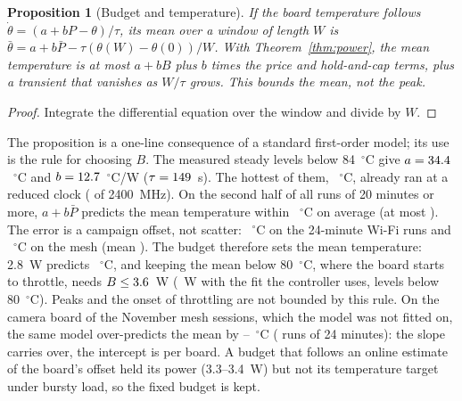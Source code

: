 \documentclass[conference]{IEEEtran}
\newtheorem{proposition}{Proposition}
\begin{document}
\begin{proposition}[Budget and temperature]\label{prop:temp}
If the board temperature follows $\dot\theta = (a + bP - \theta)/\tau$, its mean over a window of length $W$ is
$\bar\theta = a + b\bar P - \tau(\theta(W) - \theta(0))/W$. With Theorem~\ref{thm:power}, the mean temperature is at
most $a + bB$ plus $b$ times the price and hold-and-cap terms, plus a transient that vanishes as $W/\tau$ grows. This
bounds the mean, not the peak.
\end{proposition}
\begin{proof}
Integrate the differential equation over the window and divide by $W$.
\end{proof}
The proposition is a one-line consequence of a standard first-order model; its use is the rule for choosing $B$. The
\ThLevels{} measured steady levels below 84~$^\circ$C give $a = 34.4$~$^\circ$C and $b = 12.7$~$^\circ$C/W
($\tau = 149$~s). The hottest of them, \ThHotLevelC~$^\circ$C, already ran at a reduced clock (\ThHotLevelMhz{} of
2400~MHz). On the second half of all \ThRuns{} runs of 20 minutes or more, $a + b\bar P$ predicts the mean temperature
within \ThMae~$^\circ$C on average (at most \ThMax). The error is a campaign offset, not scatter: \ThBiasWifi~$^\circ$C
on the 24-minute Wi-Fi runs and \ThBiasMesh~$^\circ$C on the mesh (mean \ThMeanErr). The budget therefore sets the mean
temperature: 2.8~W predicts \ThPredBudget~$^\circ$C, and keeping the mean below 80~$^\circ$C, where the board starts to
throttle, needs $B \le 3.6$~W (\ThBudgetEightyCtl~W with the fit the controller uses, levels below
80~$^\circ$C). Peaks and the onset of throttling are not bounded by this rule. On the camera board of the November mesh
sessions, which the model was not fitted on, the same model over-predicts the mean by \ThNovBiasMin--\ThNovBiasMax~$^\circ$C
(\ThNovRuns{} runs of 24 minutes): the slope carries over, the intercept is per board. A budget that follows an online
estimate of the board's offset held its power (3.3--3.4~W) but not its temperature target under bursty load, so the
fixed budget is kept.
\end{document}

